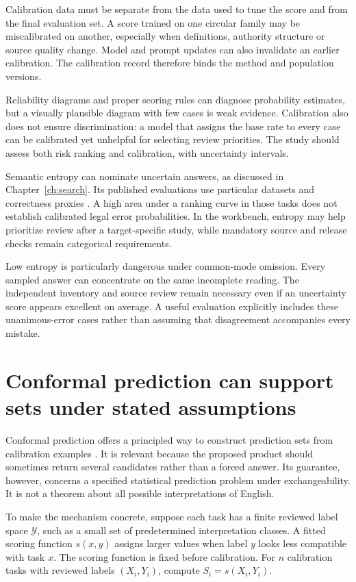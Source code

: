 \documentclass[12pt,a4paper,oneside,openany]{book}
\begin{document}
Calibration data must be separate from the data used to tune the score and from
the final evaluation set. A score trained on one circular family may be
miscalibrated on another, especially when definitions, authority structure or
source quality change. Model and prompt updates can also invalidate an earlier
calibration. The calibration record therefore binds the method and population
versions.

Reliability diagrams and proper scoring rules can diagnose probability estimates,
but a visually plausible diagram with few cases is weak evidence. Calibration
also does not ensure discrimination: a model that assigns the base rate to every
case can be calibrated yet unhelpful for selecting review priorities. The study
should assess both risk ranking and calibration, with uncertainty intervals.

Semantic entropy can nominate uncertain answers, as discussed in
Chapter~\ref{ch:search}. Its published evaluations use particular datasets and
correctness proxies \citep{semantic2023}. A high area under a ranking curve in
those tasks does not establish calibrated legal error probabilities. In the
workbench, entropy may help prioritize review after a target-specific study, while
mandatory source and release checks remain categorical requirements.

Low entropy is particularly dangerous under common-mode omission. Every sampled
answer can concentrate on the same incomplete reading. The independent inventory
and source review remain necessary even if an uncertainty score appears excellent
on average. A useful evaluation explicitly includes these unanimous-error cases
rather than assuming that disagreement accompanies every mistake.

\section{Conformal prediction can support sets under stated assumptions}

Conformal prediction offers a principled way to construct prediction sets from
calibration examples \citep[section 1.1 and appendix D]{conformal2022}. It is
relevant because the proposed product should sometimes return several candidates
rather than a forced answer. Its guarantee, however, concerns a specified
statistical prediction problem under exchangeability. It is not a theorem about
all possible interpretations of English.

To make the mechanism concrete, suppose each task has a finite reviewed label
space $\mathcal Y$, such as a small set of predetermined interpretation classes.
A fitted scoring function $s(x,y)$ assigns larger values when label $y$ looks less
compatible with task $x$. The scoring function is fixed before calibration.
For $n$ calibration tasks with reviewed labels $(X_i,Y_i)$, compute
$S_i=s(X_i,Y_i)$.
\end{document}
